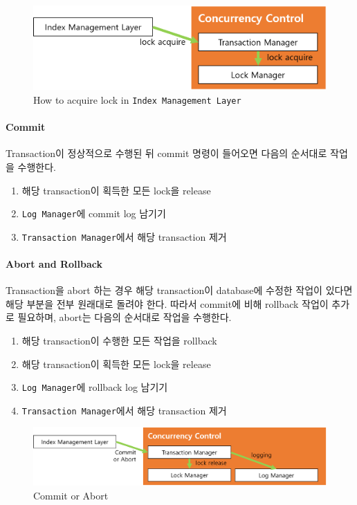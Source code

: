 \documentclass[main.tex]{subfiles}
\begin{document}
\begin{figure}[!hbt]
	\centering
	\includegraphics[width=.8\textwidth]{images/cc/lock_acquire.png}
	\caption{How to acquire lock in \texttt{Index Management Layer}}
\end{figure}

\paragraph{Commit}
Transaction이 정상적으로 수행된 뒤 commit 명령이 들어오면 다음의 순서대로 작업을 수행한다.

\begin{enumerate}
	\item 해당 transaction이 획득한 모든 lock을 release
	\item \texttt{Log Manager}에 commit log 남기기
	\item \texttt{Transaction Manager}에서 해당 transaction 제거
\end{enumerate}

\paragraph{Abort and Rollback}
Transaction을 abort 하는 경우 해당 transaction이 database에 수정한 작업이 있다면 해당 부분을 전부 원래대로 돌려야 한다.
따라서 commit에 비해 rollback 작업이 추가로 필요하며, abort는 다음의 순서대로 작업을 수행한다.

\begin{enumerate}
	\item 해당 transaction이 수행한 모든 작업을 rollback
	\item 해당 transaction이 획득한 모든 lock을 release
	\item \texttt{Log Manager}에 rollback log 남기기
	\item \texttt{Transaction Manager}에서 해당 transaction 제거
\end{enumerate}

\begin{figure}[!hbt]
	\centering
	\includegraphics[width=.9\textwidth]{images/cc/commit_abort.png}
	\caption{Commit or Abort}
\end{figure}
\end{document}
